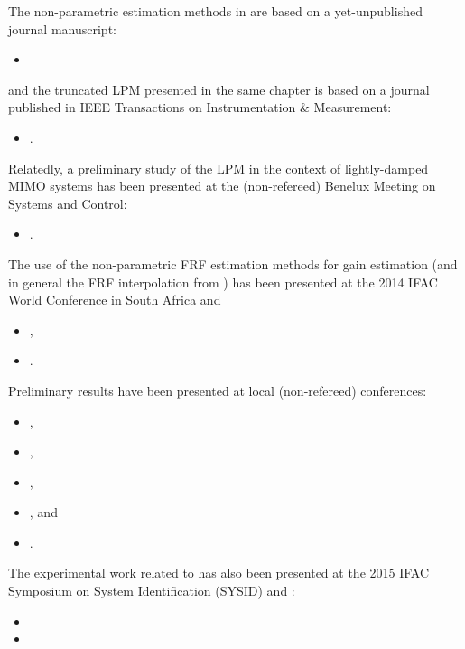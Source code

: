 \begin{refsection}
The non-parametric estimation methods in  are based on a yet-unpublished journal manuscript:
\begin{itemize}
  \item {}
\end{itemize}
and the truncated \gls{LPM} presented in the same chapter is based on a journal published in \gls{IEEE} Transactions on Instrumentation \& Measurement:
\begin{itemize}
  \item {}.
\end{itemize}
Relatedly, a preliminary study of the \gls{LPM} in the context of lightly-damped \gls{MIMO} systems has been presented at the (non-refereed) Benelux Meeting on Systems and Control:
\begin{itemize}
    \item {}.
\end{itemize}


The use of the non-parametric \gls{FRF} estimation methods for \Hinf gain estimation (and in general the \gls{FRF} interpolation from ) has been presented at the 2014 \gls{IFAC} World Conference in South Africa and 
\begin{itemize}
  \item {},
  \item {}.
\end{itemize}
Preliminary results have been presented at local (non-refereed) conferences:
\begin{itemize}
  \item {},
  \item {},
  \item {},
  \item {}, and
  \item {}.
\end{itemize}
The experimental work related to  has also been presented at the 2015 \gls{IFAC} Symposium on System Identification (\textsc{SYSID}) and :
\begin{itemize}
  \item {}
  \item {}
\end{itemize}


\end{refsection}
